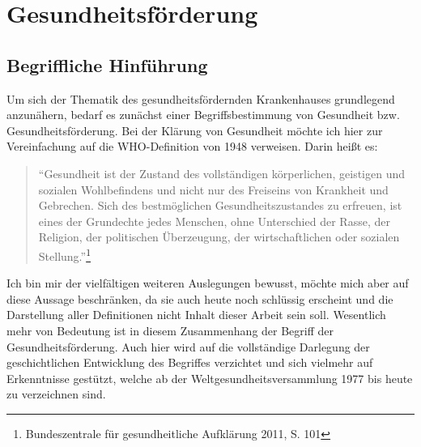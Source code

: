 \section{Gesundheitsförderung}
\label{sec:Gesundheitsförderung}

\subsection{Begriffliche Hinführung}
\label{sec:BegrifflicheHinführung}

Um sich der Thematik des gesundheitsfördernden Krankenhauses grundlegend anzunähern, bedarf es zunächst einer Begriffsbestimmung von Gesundheit bzw. Gesundheitsförderung. Bei der Klärung von Gesundheit möchte ich hier zur Vereinfachung auf die WHO-Definition von 1948 verweisen. Darin heißt es: 

\begin{quotation}
\begin{center}
"`Gesundheit ist der Zustand des vollständigen körperlichen, geistigen und sozialen Wohlbefindens und nicht nur des Freiseins von Krankheit und Gebrechen. Sich des bestmöglichen Gesundheitszustandes zu erfreuen, ist eines der Grundechte jedes Menschen, ohne Unterschied der  Rasse, der Religion, der politischen Überzeugung, der wirtschaftlichen oder sozialen Stellung."'\footnote{Bundeszentrale für gesundheitliche Aufklärung 2011, S. 101}
\end{center}
\end{quotation}

Ich bin mir der vielfältigen weiteren Auslegungen bewusst, möchte mich aber auf diese Aussage beschränken, da sie auch heute noch schlüssig erscheint und die Darstellung aller Definitionen nicht Inhalt dieser Arbeit sein soll. Wesentlich mehr von Bedeutung ist in diesem Zusammenhang der Begriff der Gesundheitsförderung. Auch hier wird auf die vollständige Darlegung der geschichtlichen Entwicklung des Begriffes verzichtet und sich vielmehr auf Erkenntnisse gestützt, welche ab der Weltgesundheitsversammlung 1977 bis heute zu verzeichnen sind.

